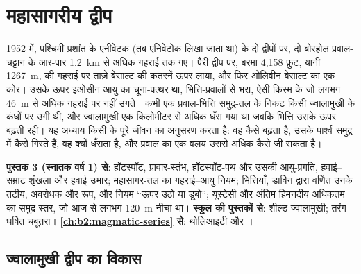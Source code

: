 \chapter{महासागरीय द्वीप}\label{ch:b2:oceanic-islands}

1952 में, पश्चिमी प्रशांत के एनीवेटक  (तब एनिवेटोक लिखा जाता था) के दो द्वीपों पर, दो
बोरहोल प्रवाल-चट्टान के आर-पार \qty{1.2}{km} से अधिक गहराई तक गए। पैरी द्वीप पर, बरमा
4,158 फ़ुट, यानी \qty{1267}{m}, की गहराई पर ताज़े बेसाल्ट की कतरनें ऊपर लाया, और फिर
ओलिवीन बेसाल्ट का एक कोर। उसके ऊपर इओसीन आयु का चूना-पत्थर था, भित्ति-प्रवालों से भरा, ऐसी किस्म के जो
लगभग \qty{46}{m} से अधिक गहराई पर नहीं उगते। कभी एक प्रवाल-भित्ति समुद्र-तल के निकट किसी ज्वालामुखी के
कंधों पर उगी थी, और ज्वालामुखी एक किलोमीटर से अधिक धँस गया था जबकि भित्ति उसके ऊपर बढ़ती रही।
यह अध्याय किसी  के पूरे जीवन का अनुसरण करता है: वह कैसे बढ़ता है, उसके पार्श्व
समुद्र में कैसे गिरते हैं, वह क्यों धँसता है, और प्रवाल का एक वलय उससे अधिक कैसे जी सकता है।

\begin{recall}
\textbf{पुस्तक 3 (स्नातक वर्ष 1) से}: हॉटस्पॉट, प्रावार-स्तंभ, हॉटस्पॉट-पथ और उसकी आयु-प्रगति,
हवाई--सम्राट शृंखला और हवाई उभार; महासागर-तल का गहराई–आयु नियम; भित्तियाँ,
डार्विन द्वारा वर्णित उनके तटीय, अवरोधक और  रूप, और नियम ``ऊपर उठो या
डूबो''; यूस्टेसी और अंतिम हिमनदीय अधिकतम का समुद्र-स्तर, जो आज से लगभग \qty{120}{m}
नीचा था। \textbf{स्कूल की पुस्तकों से}: शील्ड ज्वालामुखी; तरंग-घर्षित चबूतरा।
\textbf{\cref{ch:b2:magmatic-series} से}: थोलिआइटी और ।
\end{recall}

\section{ज्वालामुखी द्वीप का विकास}\label{sec:b2:oceanic-islands:growth}

